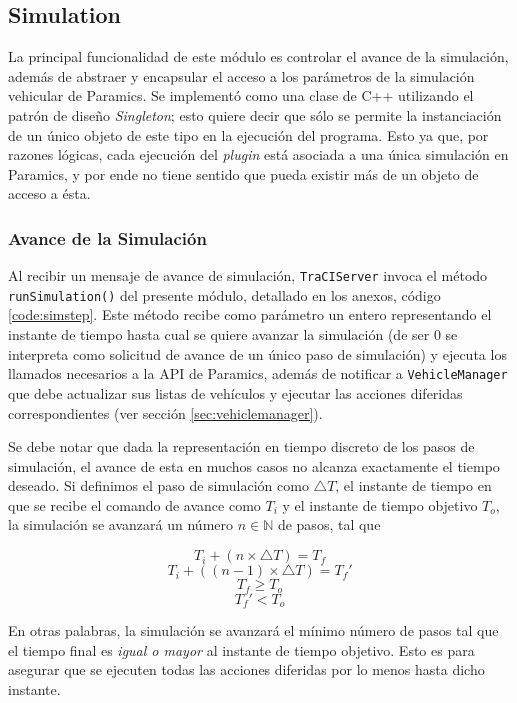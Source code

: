 \subsection{Simulation}\label{sec:simulation}

La principal funcionalidad de este módulo es controlar el avance de la simulación, además de abstraer y encapsular el acceso a los parámetros de la simulación vehicular de Paramics. Se implementó como una clase de C++ utilizando el patrón de diseño \emph{Singleton}; esto quiere decir que sólo se permite la instanciación de un único objeto de este tipo en la ejecución del programa. Esto ya que, por razones lógicas, cada ejecución del \emph{plugin} está asociada a una única simulación en Paramics, y por ende no tiene sentido que pueda existir más de un objeto de acceso a ésta.

\subsubsection{Avance de la Simulación}

Al recibir un mensaje de avance de simulación, \texttt{TraCIServer} invoca el método \texttt{runSimulation()} del presente módulo, detallado en los anexos, código \ref{code:simstep}. Este método recibe como parámetro un entero representando el instante de tiempo hasta cual se quiere avanzar la simulación (de ser $0$ se interpreta como solicitud de avance de un único paso de simulación) y ejecuta los llamados necesarios a la API de Paramics, además de notificar a \texttt{VehicleManager} que debe actualizar sus listas de vehículos y ejecutar las acciones diferidas correspondientes (ver sección \ref{sec:vehiclemanager}).

Se debe notar que dada la representación en tiempo discreto de los pasos de simulación, el avance de esta en muchos casos no alcanza exactamente el tiempo deseado. Si definimos el paso de simulación como $\triangle T$, el instante de tiempo en que se recibe el comando de avance como $T_{i}$ y el instante de tiempo objetivo $T_{o}$, la simulación se avanzará un número $n \in \mathbb{N}$ de pasos, tal que

\[ T_{i} + (n \times \triangle T) = T_{f} \]
\[ T_{i} + ((n - 1) \times \triangle T) = T_{f}' \]
\[ T_{f} \geq T_{o} \]
\[ T_{f}' < T_{o} \]

En otras palabras, la simulación se avanzará el mínimo número de pasos tal que el tiempo final es \emph{igual o mayor} al instante de tiempo objetivo. Esto es para asegurar que se ejecuten todas las acciones diferidas por lo menos hasta dicho instante.

